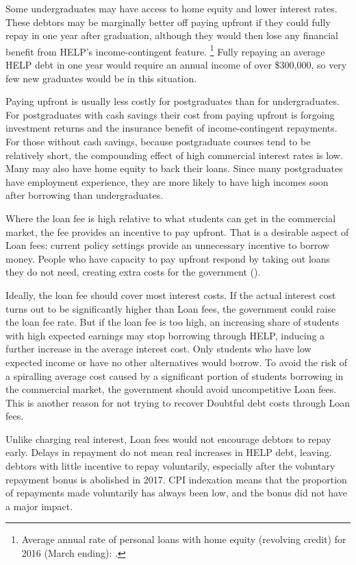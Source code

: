 \documentclass[embargoed]{grattan}
\begin{document}
Some undergraduates may have access to home equity and lower interest rates.
These debtors may be marginally better off paying upfront if they could fully repay in one year after graduation, although they would then lose any financial benefit from \gls{HELP}'s income-contingent feature.%
\footnote{Average annual rate of personal loans with home equity (revolving credit) for 2016 (March ending): \textcite{RBA2016F5Indicatorlending}.} Fully repaying an average \gls{HELP} debt in one year would require an annual income of over \$300,000, so very few new graduates would be in this situation.

Paying upfront is usually less costly for postgraduates than for undergraduates.
For postgraduates with cash savings their cost from paying upfront is forgoing investment returns and the insurance benefit of income-contingent repayments.
For those without cash savings, because postgraduate courses tend to be relatively short, the compounding effect of high commercial interest rates is low.
Many may also have home equity to back their loans.
Since many postgraduates have employment experience, they are more likely to have high incomes soon after borrowing than undergraduates.

Where the loan fee is high relative to what students can get in the commercial market, the fee provides an incentive to pay upfront.
That is a desirable aspect of \gls{Loan fees}: current policy settings provide an unnecessary incentive to borrow money.
People who have capacity to pay upfront respond by taking out loans they do not need, creating extra costs for the government ().

Ideally, the loan fee should cover most interest costs.
If the actual interest cost turns out to be significantly higher than \gls{Loan fees}, the government could raise the loan fee rate.
But if the loan fee is too high, an increasing share of students with high expected earnings may stop borrowing through \gls{HELP}, inducing a further increase in the average interest cost.
Only students who have low expected income or have no other alternatives would borrow.
To avoid the risk of a spiralling average cost caused by a significant portion of students borrowing in the commercial market, the government should avoid uncompetitive \gls{Loan fees}.
This is another reason for not trying to recover \gls{Doubtful debt} costs through \gls{Loan fees}.

Unlike charging real interest, \gls{Loan fees} would not encourage debtors to repay early.
Delays in repayment do not mean real increases in \gls{HELP} debt, leaving. debtors with little incentive to repay voluntarily, especially after the voluntary repayment bonus is abolished in 2017.
\gls{CPI} indexation means that the proportion of repayments made voluntarily has always been low, and the bonus did not have a major impact.
\end{document}

